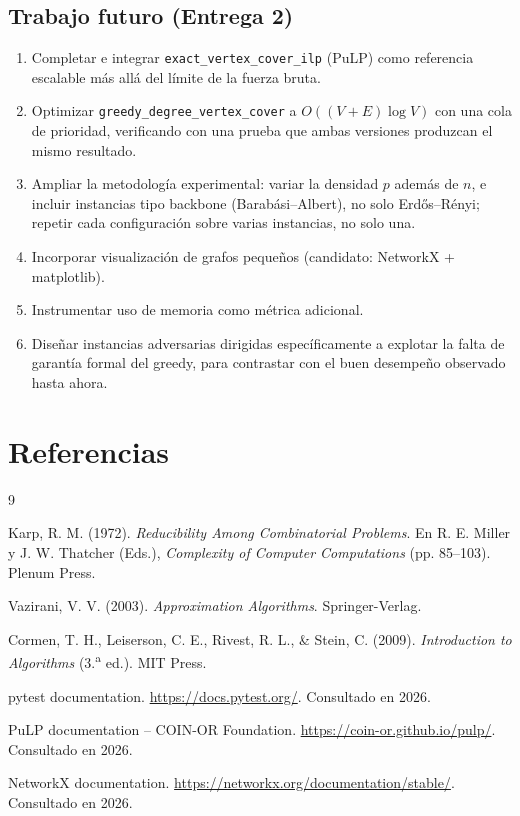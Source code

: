 \documentclass[11pt,a4paper]{article}
\begin{document}
\subsection{Trabajo futuro (Entrega 2)}
\begin{enumerate}[itemsep=2pt]
	\item Completar e integrar \texttt{exact\_vertex\_cover\_ilp} (PuLP) como referencia
	escalable más allá del límite de la fuerza bruta.
	\item Optimizar \texttt{greedy\_degree\_vertex\_cover} a $O((V+E)\log V)$ con una cola de
	prioridad, verificando con una prueba que ambas versiones produzcan el mismo resultado.
	\item Ampliar la metodología experimental: variar la densidad $p$ además de $n$, e
	incluir instancias tipo backbone (Barabási–Albert), no solo Erdős–Rényi; repetir cada
	configuración sobre varias instancias, no solo una.
	\item Incorporar visualización de grafos pequeños (candidato: NetworkX + matplotlib).
	\item Instrumentar uso de memoria como métrica adicional.
	\item Diseñar instancias adversarias dirigidas específicamente a explotar la falta de
	garantía formal del greedy, para contrastar con el buen desempeño observado hasta ahora.
\end{enumerate}

\section{Referencias}

\begin{thebibliography}{9}

Karp, R. M. (1972). \emph{Reducibility Among Combinatorial Problems}. En R. E. Miller y
J. W. Thatcher (Eds.), \emph{Complexity of Computer Computations} (pp. 85--103). Plenum
Press.

Vazirani, V. V. (2003). \emph{Approximation Algorithms}. Springer-Verlag.

Cormen, T. H., Leiserson, C. E., Rivest, R. L., \& Stein, C. (2009). \emph{Introduction to
Algorithms} (3.\textsuperscript{a} ed.). MIT Press.

pytest documentation. \url{https://docs.pytest.org/}. Consultado en 2026.

PuLP documentation -- COIN-OR Foundation. \url{https://coin-or.github.io/pulp/}. Consultado
en 2026.

NetworkX documentation. \url{https://networkx.org/documentation/stable/}. Consultado en
2026.

\end{thebibliography}
\end{document}
